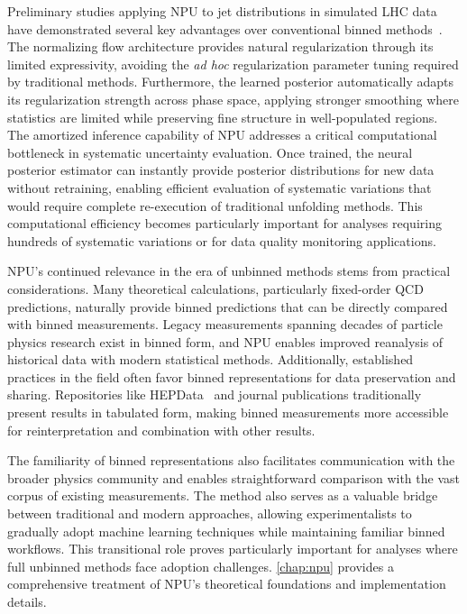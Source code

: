     Preliminary studies applying NPU to jet distributions in simulated LHC data have demonstrated several key advantages over conventional binned methods~\cite{acosta2024npu}.
    The normalizing flow architecture provides natural regularization through its limited expressivity, avoiding the \textit{ad hoc} regularization parameter tuning required by traditional methods.
    Furthermore, the learned posterior automatically adapts its regularization strength across phase space, applying stronger smoothing where statistics are limited while preserving fine structure in well-populated regions.
    The amortized inference capability of NPU addresses a critical computational bottleneck in systematic uncertainty evaluation.
    Once trained, the neural posterior estimator can instantly provide posterior distributions for new data without retraining, enabling efficient evaluation of systematic variations that would require complete re-execution of traditional unfolding methods.
    This computational efficiency becomes particularly important for analyses requiring hundreds of systematic variations or for data quality monitoring applications.
    
    NPU's continued relevance in the era of unbinned methods stems from practical considerations.
    Many theoretical calculations, particularly fixed-order QCD predictions, naturally provide binned predictions that can be directly compared with binned measurements.
    Legacy measurements spanning decades of particle physics research exist in binned form, and NPU enables improved reanalysis of historical data with modern statistical methods.
    Additionally, established practices in the field often favor binned representations for data preservation and sharing.
    Repositories like HEPData~\cite{Maguire:2017ypu} and journal publications traditionally present results in tabulated form, making binned measurements more accessible for reinterpretation and combination with other results.
    
The familiarity of binned representations also facilitates communication with the broader physics community and enables straightforward comparison with the vast corpus of existing measurements.
    The method also serves as a valuable bridge between traditional and modern approaches, allowing experimentalists to gradually adopt machine learning techniques while maintaining familiar binned workflows.
    This transitional role proves particularly important for analyses where full unbinned methods face adoption challenges.
    \cref{chap:npu} provides a comprehensive treatment of NPU's theoretical foundations and implementation details.
    
